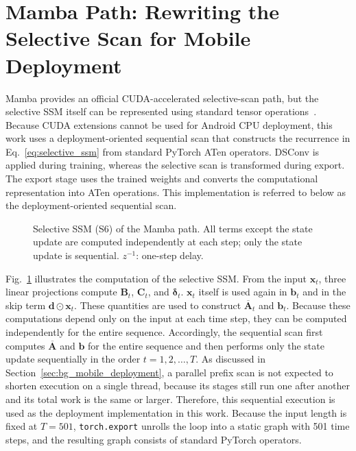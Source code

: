 \section{Mamba Path: Rewriting the Selective Scan for Mobile Deployment}
\label{sec:opt_mamba}
 
Mamba provides an official CUDA-accelerated selective-scan path, but the selective SSM itself can be represented using standard tensor operations~\cite{gu2023mamba}.
Because CUDA extensions cannot be used for Android CPU deployment, this work uses a deployment-oriented sequential scan that constructs the recurrence in Eq.~\eqref{eq:selective_ssm} from standard PyTorch ATen operators.
DSConv is applied during training, whereas the selective scan is transformed during export.
The export stage uses the trained weights and converts the computational representation into ATen operations.
This implementation is referred to below as the deployment-oriented sequential scan.
 
\begin{figure}[t]
\centering

\caption[Selective SSM (S6) of the Mamba path.]{%
Selective SSM (S6) of the Mamba path.
All terms except the state update are computed independently at each step;
only the state update is sequential.
$z^{-1}$: one-step delay.}
\label{fig:ssm_block}
\end{figure}
 
Fig.~\ref{fig:ssm_block} illustrates the computation of the selective SSM.
From the input $\mathbf{x}_t$, three linear projections compute $\mathbf{B}_t$, $\mathbf{C}_t$, and $\boldsymbol{\delta}_t$.
$\mathbf{x}_t$ itself is used again in $\mathbf{b}_t$ and in the skip term $\mathbf{d}\odot\mathbf{x}_t$.
These quantities are used to construct $\overline{\mathbf{A}}_t$ and $\mathbf{b}_t$.
Because these computations depend only on the input at each time step, they can be computed independently for the entire sequence.
Accordingly, the sequential scan first computes $\overline{\mathbf{A}}$ and $\mathbf{b}$ for the entire sequence and then performs only the state update sequentially in the order $t=1,2,\ldots,T$.
As discussed in Section~\ref{sec:bg_mobile_deployment}, a parallel prefix scan is not expected to shorten execution on a single thread, because its stages still run one after another and its total work is the same or larger.
Therefore, this sequential execution is used as the deployment implementation in this work.
Because the input length is fixed at $T=501$, \texttt{torch.export} unrolls the loop into a static graph with 501 time steps, and the resulting graph consists of standard PyTorch operators.
 
